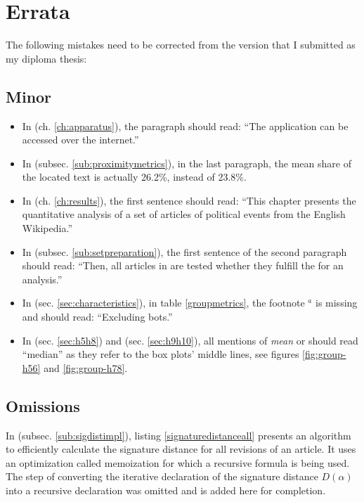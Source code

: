 \chapter{Errata}

The following mistakes need to be corrected from the version that I submitted as my diploma thesis:

\section{Minor}

\begin{itemize}
  \item In  (ch. \ref{ch:apparatus}), the  paragraph should read: ``The application can be accessed over the internet.''
  \item In  (subsec. \ref{sub:proximitymetrics}), in the last paragraph, the mean share of the located text is actually 26.2\%, instead of 23.8\%.
  \item In  (ch. \ref{ch:results}), the first sentence should read: ``This chapter presents the quantitative analysis of a set of articles of political events from the English Wikipedia.''
  \item In  (subsec. \ref{sub:setpreparation}), the first sentence of the second paragraph should read: ``Then, all articles in  are tested whether they fulfill the  for an analysis.''
  \item In  (sec. \ref{sec:characteristics}), in table \ref{groupmetrics}, the footnote $^{a}$ is missing and should read: ``Excluding bots.''
  \item In  (sec. \ref{sec:h5h8}) and  (sec. \ref{sec:h9h10}), all mentions of \emph{mean} or  should read ``median'' as they refer to the box plots' middle lines, see figures \ref{fig:group-h56} and \ref{fig:group-h78}.
\end{itemize}


\section{Omissions}

In  (subsec. \ref{sub:sigdistimpl}), listing \ref{signaturedistanceall} presents an algorithm to efficiently calculate the signature distance for all revisions of an article.
It uses an optimization called memoization for which a recursive formula is being used. 
The step of converting the iterative declaration of the signature distance $D(\alpha)$ into a recursive declaration was omitted and is added here for completion.

